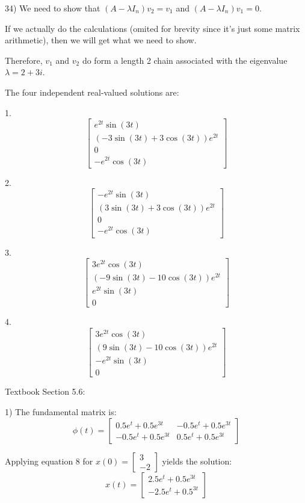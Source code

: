 \documentclass{article}
\begin{document}
34) We need to show that $(A - \lambda I_n) v_2 = v_1$
and $(A - \lambda I_n) v_1 = 0$.

If we actually do the calculations (omited for brevity
since it's just some matrix arithmetic),
then we will get what we need to show.

Therefore, $v_1$ and $v_2$ do form a length 2 chain associated with
the eigenvalue $\lambda = 2 + 3i$.

The four independent real-valued solutions are:

1. \[\begin{bmatrix}
    e^{2t} \sin(3t) \\
    (-3 \sin(3t) + 3 \cos(3t)) e^{2t} \\
    0 \\
    -e^{2t} \cos(3t)
\end{bmatrix}\]

2. \[\begin{bmatrix}
    -e^{2t} \sin(3t) \\
    (3 \sin(3t) + 3 \cos(3t)) e^{2t} \\
    0 \\
    -e^{2t} \cos(3t)
\end{bmatrix}\]

3. \[\begin{bmatrix}
    3e^{2t} \cos(3t) \\
    (-9 \sin(3t) - 10 \cos(3t)) e^{2t} \\
    e^{2t} \sin(3t) \\
    0
\end{bmatrix}\]

4. \[\begin{bmatrix}
    3e^{2t} \cos(3t) \\
    (9 \sin(3t) - 10 \cos(3t)) e^{2t} \\
    -e^{2t} \sin(3t) \\
    0
\end{bmatrix}\]


Textbook Section 5.6:

1) The fundamental matrix is:
\[\phi(t) = \begin{bmatrix}
    0.5e^t + 0.5e^{3t} & -0.5e^t + 0.5e^{3t} \\
    -0.5e^t + 0.5e^{3t} & 0.5e^t + 0.5e^{3t}
\end{bmatrix}\]

Applying equation 8 for $x(0) = \begin{bmatrix}
    3 \\
    -2
\end{bmatrix}$ yields the solution:
\[x(t) = \begin{bmatrix}
    2.5e^t + 0.5e^{3t} \\
    -2.5e^t + 0.5^{3t}
\end{bmatrix}\]
\end{document}
